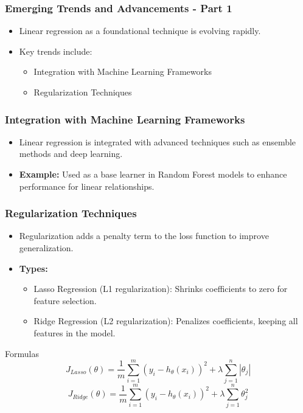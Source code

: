 \documentclass[aspectratio=169]{beamer}
\begin{document}
\begin{frame}[fragile]
    \frametitle{Emerging Trends and Advancements - Part 1}
    
    \begin{itemize}
        \item Linear regression as a foundational technique is evolving rapidly.
        \item Key trends include:
            \begin{itemize}
                \item Integration with Machine Learning Frameworks
                \item Regularization Techniques
            \end{itemize}
    \end{itemize}
\end{frame}

\begin{frame}[fragile]
    \frametitle{Integration with Machine Learning Frameworks}
    \begin{itemize}
        \item Linear regression is integrated with advanced techniques such as ensemble methods and deep learning.
        \item \textbf{Example:} Used as a base learner in Random Forest models to enhance performance for linear relationships.
    \end{itemize}
\end{frame}

\begin{frame}[fragile]
    \frametitle{Regularization Techniques}
    \begin{itemize}
        \item Regularization adds a penalty term to the loss function to improve generalization.
        \item \textbf{Types:}
            \begin{itemize}
                \item Lasso Regression (L1 regularization): Shrinks coefficients to zero for feature selection.
                \item Ridge Regression (L2 regularization): Penalizes coefficients, keeping all features in the model.
            \end{itemize}
    \end{itemize}
    \begin{block}{Formulas}
        \begin{equation}
            J_{Lasso}(\theta) = \frac{1}{m} \sum_{i=1}^{m} (y_i - h_\theta(x_i))^2 + \lambda \sum_{j=1}^{n} |\theta_j|
        \end{equation}
        \begin{equation}
            J_{Ridge}(\theta) = \frac{1}{m} \sum_{i=1}^{m} (y_i - h_\theta(x_i))^2 + \lambda \sum_{j=1}^{n} \theta_j^2
        \end{equation}
    \end{block}
\end{frame}
\end{document}
